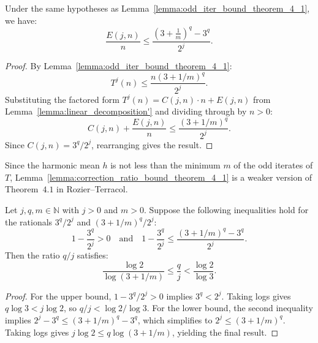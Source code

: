 \begin{lemma}\label{lemma:correction_ratio_bound_theorem_4_1}\leanok
Under the same hypotheses as Lemma~\ref{lemma:odd_iter_bound_theorem_4_1}, we have:
\begin{equation}
    \frac{E(j, n)}{n} \le \frac{\left(3 + \frac{1}{m}\right)^q - 3^q}{2^j}.
\end{equation}
\end{lemma}
\begin{proof}\leanok
By Lemma~\ref{lemma:odd_iter_bound_theorem_4_1}:
\begin{equation}
    T^j(n) \le \frac{n(3+1/m)^q}{2^j}.
\end{equation}
Substituting the factored form $T^j(n) = C(j,n) \cdot n + E(j,n)$ from Lemma~\ref{lemma:linear_decomposition'} and dividing through by $n > 0$:
\begin{equation}
    C(j,n) + \frac{E(j,n)}{n} \le \frac{(3+1/m)^q}{2^j}.
\end{equation}
Since $C(j, n) = 3^q / 2^j$, rearranging gives the result.
\end{proof}


  Since the harmonic mean $h$ is not less than the minimum $m$ of the odd iterates of $T$,
  Lemma~\ref{lemma:correction_ratio_bound_theorem_4_1} is a weaker version of
  Theorem~$4.1$ in Rozier--Terracol.


\begin{lemma}\label{lemma:paradoxical_ratio_real}\leanok
Let $j, q, m \in \mathbb{N}$ with $j > 0$ and $m > 0$. Suppose the following inequalities hold for the rationals $3^q/2^j$ and $(3+1/m)^q/2^j$:
\begin{equation}
    1 - \frac{3^q}{2^j} > 0 \quad \text{and} \quad 1 - \frac{3^q}{2^j} \le \frac{(3 + 1/m)^q - 3^q}{2^j}.
\end{equation}
Then the ratio $q/j$ satisfies:
\begin{equation}
    \frac{\log 2}{\log(3 + 1/m)} \le \frac{q}{j} < \frac{\log 2}{\log 3}.
\end{equation}
\end{lemma}
\begin{proof}\leanok
For the upper bound, $1 - 3^q/2^j > 0$ implies $3^q < 2^j$. Taking logs gives $q \log 3 < j \log 2$, so $q/j < \log 2 / \log 3$.
For the lower bound, the second inequality implies $2^j - 3^q \le (3+1/m)^q - 3^q$, which simplifies to $2^j \le (3+1/m)^q$. Taking logs gives $j \log 2 \le q \log(3+1/m)$, yielding the final result.
\end{proof}

